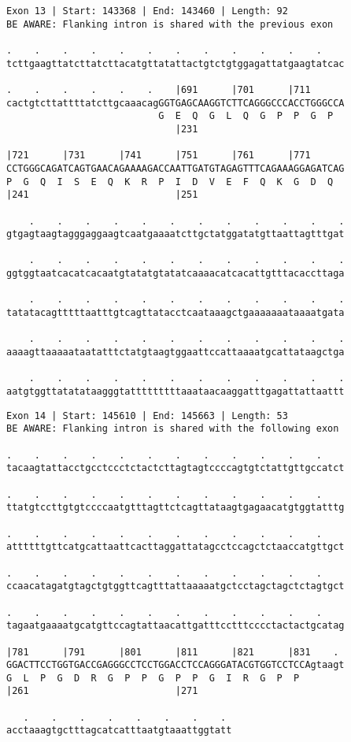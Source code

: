 \documentclass{article}
\begin{document}
\begin{Verbatim}
Exon 13 | Start: 143368 | End: 143460 | Length: 92
BE AWARE: Flanking intron is shared with the previous exon
 
.    .    .    .    .    .    .    .    .    .    .    .    
tcttgaagttatcttatcttacatgttatattactgtctgtggagattatgaagtatcac
  
.    .    .    .    .    .    |691      |701      |711      
cactgtcttattttatcttgcaaacagGGTGAGCAAGGTCTTCAGGGCCCACCTGGGCCA
                           G  E  Q  G  L  Q  G  P  P  G  P  
                              |231                          
  
|721      |731      |741      |751      |761      |771      
CCTGGGCAGATCAGTGAACAGAAAAGACCAATTGATGTAGAGTTTCAGAAAGGAGATCAG
P  G  Q  I  S  E  Q  K  R  P  I  D  V  E  F  Q  K  G  D  Q  
|241                          |251                          
  
    .    .    .    .    .    .    .    .    .    .    .    .
gtgagtaagtagggaggaagtcaatgaaaatcttgctatggatatgttaattagtttgat
  
    .    .    .    .    .    .    .    .    .    .    .    .
ggtggtaatcacatcacaatgtatatgtatatcaaaacatcacattgtttacaccttaga
  
    .    .    .    .    .    .    .    .    .    .    .    .
tatatacagtttttaatttgtcagttatacctcaataaagctgaaaaaaataaaatgata
  
    .    .    .    .    .    .    .    .    .    .    .    .
aaaagttaaaaataatatttctatgtaagtggaattccattaaaatgcattataagctga
  
    .    .    .    .    .    .    .    .    .    .    .    .
aatgtggttatatataagggtatttttttttaaataacaaggatttgagattattaattt
\end{Verbatim}
\newpage
\begin{Verbatim}
Exon 14 | Start: 145610 | End: 145663 | Length: 53
BE AWARE: Flanking intron is shared with the following exon
 
.    .    .    .    .    .    .    .    .    .    .    .    
tacaagtattacctgcctccctctactcttagtagtccccagtgtctattgttgccatct
  
.    .    .    .    .    .    .    .    .    .    .    .    
ttatgtccttgtgtccccaatgtttagttctcagttataagtgagaacatgtggtatttg
  
.    .    .    .    .    .    .    .    .    .    .    .    
attttttgttcatgcattaattcacttaggattatagcctccagctctaaccatgttgct
  
.    .    .    .    .    .    .    .    .    .    .    .    
ccaacatagatgtagctgtggttcagtttattaaaaatgctcctagctagctctagtgct
  
.    .    .    .    .    .    .    .    .    .    .    .    
tagaatgaaaatgcatgttccagtattaacattgatttcctttcccctactactgcatag
  
|781      |791      |801      |811      |821      |831    . 
GGACTTCCTGGTGACCGAGGGCCTCCTGGACCTCCAGGGATACGTGGTCCTCCAgtaagt
G  L  P  G  D  R  G  P  P  G  P  P  G  I  R  G  P  P        
|261                          |271                          
  
   .    .    .    .    .    .    .    . 
acctaaagtgctttagcatcatttaatgtaaattggtatt
\end{Verbatim}
\end{document}
